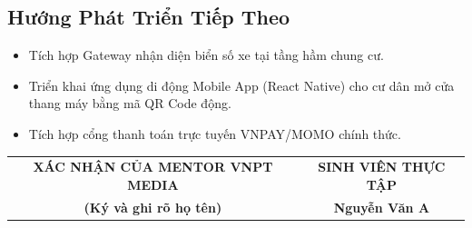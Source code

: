 \documentclass[12pt,a4paper]{article}
\begin{document}
\subsection{Hướng Phát Triển Tiếp Theo}
\begin{itemize}
    \item Tích hợp Gateway nhận diện biển số xe tại tầng hầm chung cư.
    \item Triển khai ứng dụng di động Mobile App (React Native) cho cư dân mở cửa thang máy bằng mã QR Code động.
    \item Tích hợp cổng thanh toán trực tuyến VNPAY/MOMO chính thức.
\end{itemize}

\vspace{1cm}
\begin{table}[H]
    \centering
    \begin{tabular}{cc}
        \textbf{XÁC NHẬN CỦA MENTOR VNPT MEDIA} & \textbf{SINH VIÊN THỰC TẬP} \\[2cm]
        \textbf{(Ký và ghi rõ họ tên)} & \textbf{Nguyễn Văn A} \\
    \end{tabular}
\end{table}
\end{document}
